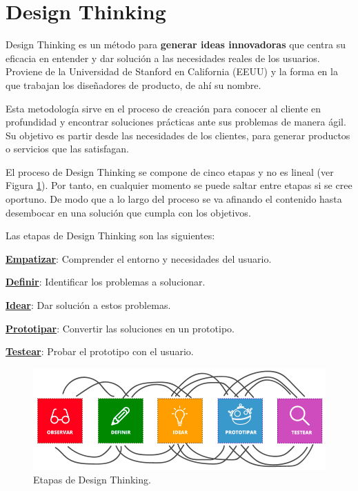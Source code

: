 \documentclass[12pt,twoside,titlepage]{report}
\begin{document}
\section{Design Thinking}
\label{sec:design}

Design Thinking es un método para \textbf{generar ideas innovadoras} que centra su eficacia en entender y dar solución a las necesidades reales de los usuarios. Proviene de la Universidad de Stanford en California (EEUU) y la forma en la que trabajan los diseñadores de producto, de ahí su nombre.
\cite{desingThinking1}

Esta metodología sirve en el proceso de creación para conocer al cliente en profundidad y encontrar soluciones prácticas ante sus problemas de manera ágil. Su objetivo es partir desde las necesidades de los clientes, para generar productos o servicios que las satisfagan.

El proceso de Design Thinking se compone de cinco etapas y no es lineal (ver Figura \ref{fig:DesignThinking}). Por tanto, en cualquier momento se puede saltar entre etapas si se cree oportuno. De modo que a lo largo del proceso se va afinando el contenido hasta desembocar en una solución que cumpla con los objetivos. 
\cite{desingThinking2}

Las etapas de Design Thinking son las siguientes:
\begin{compactitem}
    \item \hyperref[sec:empatizar]{\textbf{Empatizar}}: Comprender el entorno y necesidades del usuario. 
    \item \hyperref[sec:definir]{\textbf{Definir}}: Identificar los problemas a solucionar. 
    \item \hyperref[sec:idear]{\textbf{Idear}}: Dar solución a estos problemas. 
    \item \hyperref[sec:prototipar]{\textbf{Prototipar}}: Convertir las soluciones en un prototipo. 
    \item \hyperref[sec:testear]{\textbf{Testear}}: Probar el prototipo con el usuario.
\end{compactitem}

\begin{figure}[H] 
    \includegraphics[scale=0.44]{Design Thinking/Etapas}
    \centering
    \caption{Etapas de Design Thinking.}
    \label{fig:DesignThinking}
\end{figure}
\end{document}
